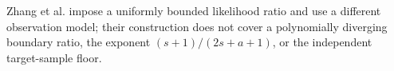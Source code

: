 Zhang et al. impose a uniformly bounded likelihood ratio and use a different observation model; their construction does not cover a polynomially diverging boundary ratio, the exponent \((s+1)/(2s+a+1)\), or the independent target-sample floor.